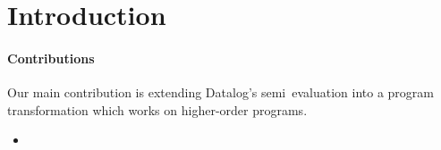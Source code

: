 \section{Introduction}
\label{sec:intro}

\paragraph{Contributions} Our main contribution is
extending Datalog's semi\naive\ evaluation into a program transformation which
works on higher-order programs.

\begin{itemize}
\item \XXX



\end{itemize}
